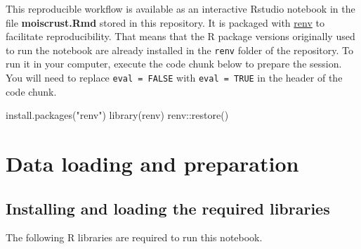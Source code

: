 \documentclass[
  table]{article}
\newenvironment{Shaded}{\begin{snugshade}}{\end{snugshade}}
\newcommand{\FunctionTok}[1]{\textcolor[rgb]{0.00,0.00,0.00}{#1}}
\newcommand{\NormalTok}[1]{#1}
\newcommand{\SpecialCharTok}[1]{\textcolor[rgb]{0.00,0.00,0.00}{#1}}
\newcommand{\StringTok}[1]{\textcolor[rgb]{0.31,0.60,0.02}{#1}}
\begin{document}
This reproducible workflow is available as an interactive Rstudio
notebook in the file \textbf{moiscrust.Rmd} stored in this repository.
It is packaged with \href{https://cran.r-project.org/package=renv}{renv}
to facilitate reproducibility. That means that the R package versions
originally used to run the notebook are already installed in the
\texttt{renv} folder of the repository. To run it in your computer,
execute the code chunk below to prepare the session. You will need to
replace \texttt{eval\ =\ FALSE} with \texttt{eval\ =\ TRUE} in the
header of the code chunk.

\begin{Shaded}
\begin{Highlighting}[]
\FunctionTok{install.packages}\NormalTok{(}\StringTok{"renv"}\NormalTok{)}
\FunctionTok{library}\NormalTok{(renv)}
\NormalTok{renv}\SpecialCharTok{::}\FunctionTok{restore}\NormalTok{()}
\end{Highlighting}
\end{Shaded}

\hypertarget{data-loading-and-preparation}{%
\section{Data loading and
preparation}\label{data-loading-and-preparation}}

\hypertarget{installing-and-loading-the-required-libraries}{%
\subsection{Installing and loading the required
libraries}\label{installing-and-loading-the-required-libraries}}

The following R libraries are required to run this notebook.
\end{document}
